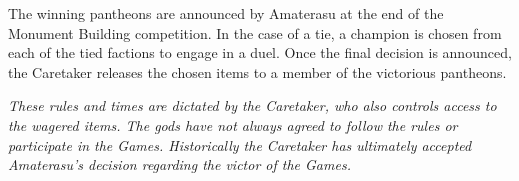 \documentclass[green]{guardians}
\begin{document}
The winning pantheons are announced by Amaterasu at the end of the Monument Building competition. In the case of a tie, a champion is chosen from each of the tied factions to engage in a duel. Once the final decision is announced, the Caretaker releases the chosen items to a member of the victorious pantheons.

\emph{These rules and times are dictated by the Caretaker, who also controls access to the wagered items. The gods have not always agreed to follow the rules or participate in the Games. Historically the Caretaker has ultimately accepted Amaterasu's decision regarding the victor of the Games.}
\end{document}

